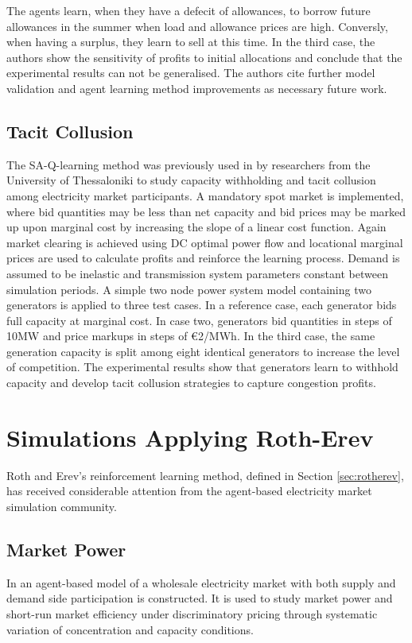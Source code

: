 The agents learn, when they have a defecit of allowances, to borrow future
allowances in the summer when load and allowance prices are high.  Conversly,
when having a surplus, they learn to sell at this time.  In the third case, the
authors show the sensitivity of profits to initial allocations and conclude that the experimental results can
not be generalised.  The authors cite further model validation and agent
learning method improvements as necessary future work.

\subsection{Tacit Collusion}
The SA-Q-learning method was previously used in \cite{tellidou:tacit} by
researchers from the University of Thessaloniki to study capacity withholding and tacit
collusion among electricity market participants.  A mandatory spot market is
implemented, where bid quantities may be less than net capacity and bid prices
may be marked up upon marginal cost by increasing the slope of a linear cost
function.  Again market clearing is achieved using DC optimal power flow and
locational marginal prices are used to calculate profits and reinforce the
learning process.  Demand is assumed to be inelastic and transmission
system parameters constant between simulation periods.  A simple two node
power system model containing two generators is applied to three test cases.
In a reference case, each generator bids full capacity at marginal cost.  In
case two, generators bid quantities in steps of 10MW and price markups in
steps of \euro{2}/MWh.  In the third case, the same generation capacity is
split among eight identical generators to increase the level of competition.
The experimental results show that generators learn to withhold capacity and
develop tacit collusion strategies to capture congestion profits.


\section{Simulations Applying Roth-Erev}
Roth and Erev's reinforcement learning method, defined in Section
\ref{sec:rotherev}, has received considerable attention from the agent-based
electricity market simulation community.

\subsection{Market Power}
In \cite{nicolaisen:2001} an agent-based model of a wholesale electricity market
with both supply and demand side participation is constructed.  It is used to
study market power and short-run market efficiency under discriminatory pricing
through systematic variation of concentration and capacity conditions.

